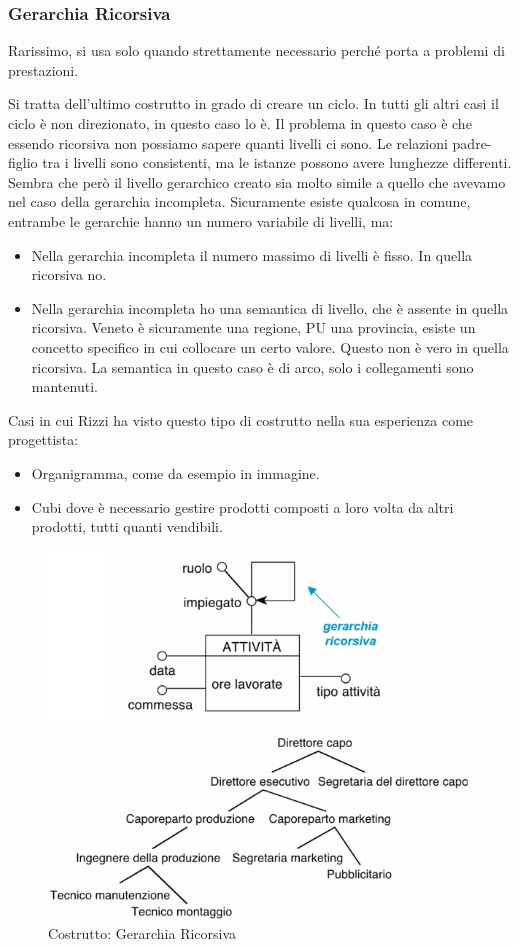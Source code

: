 \subsubsection{Gerarchia Ricorsiva}
\begin{info}
	Rarissimo, si usa solo quando strettamente necessario perché porta a problemi di prestazioni.
\end{info}
Si tratta dell'ultimo costrutto in grado di creare un ciclo. In tutti gli altri casi il ciclo è non direzionato, in questo caso lo è.\newline
Il problema in questo caso è che essendo ricorsiva non possiamo sapere quanti livelli ci sono.\newline
Le relazioni padre-figlio tra i livelli sono consistenti, ma le istanze possono avere lunghezze differenti.\newline
Sembra che però il livello gerarchico creato sia molto simile a quello che avevamo nel caso della gerarchia incompleta. Sicuramente esiste qualcosa in comune, entrambe le gerarchie hanno un numero variabile di livelli, ma:
\begin{itemize}
	\item Nella gerarchia incompleta il numero massimo di livelli è fisso. In quella ricorsiva no.
	\item Nella gerarchia incompleta ho una semantica di livello, che è assente in quella ricorsiva. Veneto è sicuramente una regione, PU una provincia, esiste un concetto specifico in cui collocare un certo valore. Questo non è vero in quella ricorsiva. La semantica in questo caso è di arco, solo i collegamenti sono mantenuti.
\end{itemize}
Casi in cui Rizzi ha visto questo tipo di costrutto nella sua esperienza come progettista:
\begin{itemize}
	\item Organigramma, come da esempio in immagine.
	\item Cubi dove è necessario gestire prodotti composti a loro volta da altri prodotti, tutti quanti vendibili.
\end{itemize}
\begin{figure}[H]
	\begin{center}
		\includegraphics[width=0.6\linewidth]{img/recursive.png}
		\caption{Costrutto: Gerarchia Ricorsiva}
	\end{center}
\end{figure}

